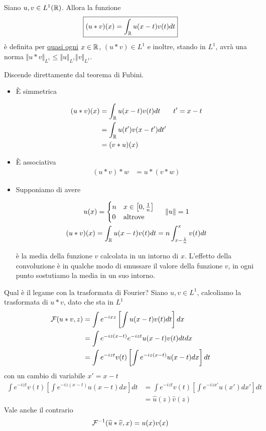 \begin{thm}
Siano $u, v\in L^{1}(\mathbb{R})$. Allora la funzione
\begin{equation*}
\boxed{(u*v)(x) = \int_{\mathbb{R}} u(x - t) v(t) dt}
\end{equation*}
è definita per \underline{quasi ogni} $x\in \mathbb{R}$, $(u*v) \in L^{1}$ e inoltre, stando in $L^{1}$, avrà una norma $ \Vert u*v \Vert_{L^{1}} \leq \Vert u \Vert_{L^{1}} \Vert v \Vert_{L^{1}}$.
\end{thm}
Discende direttamente dal teorema di Fubini.
\begin{itemize}
\item È simmetrica

\begin{align*}
(u*v)(x) & = \int_{\mathbb{R}} u(x - t) v(t) dt & t' = x - t\\
 & = \int_{\mathbb{R}} u(t') v(x - t') dt' & \\
 & = (v*u)(x) &
\end{align*}
\item È associativa
\begin{align*}
(u*v) *w & = u*(v*w)
\end{align*}
\item Supponiamo di avere

\begin{gather*}
u(x) =
\begin{cases}
n & x\in \left[0, \frac{1}{n}\right]\\
0 & \text{altrove}
\end{cases} \ \ \ \ \Vert u \Vert = 1\\
(u*v)(x) = \int_{\mathbb{R}} u(x - t) v(t) dt = n\int^{x}_{x - \frac{1}{n}} v(t) dt
\end{gather*}

è la media della funzione $v$ calcolata in un intorno di $x$. L'effetto della convoluzione è in qualche modo di smussare il valore della funzione $v$, in ogni punto sostutiamo la media in un suo intorno.
\end{itemize}

Qual è il legame con la trasformata di Fourier? Siano $u, v\in L^{1}$, calcoliamo la trasformata di $u*v$, dato che sta in $L^{1}$
\begin{align*}
\mathcal{F}(u*v, z) & = \int e^{- ixz}\left[\int u(x - t) v(t) dt\right] dx\\
 & = \int e^{- iz(x - t)} e^{- izt} u(x - t) v(t) dtdx\\
 & = \int e^{- izt} v(t)\left[\int e^{- iz(x - t)} u(x - t) dx\right] dt
\end{align*}
con un cambio di variabile $x' = x - t$
\begin{align*}
\int e^{- izt} v(t)\left[\int e^{- iz(x - t)} u(x - t) dx\right] dt & = \int e^{- izt} v(t)\left[\int e^{- izx'} u(x') dx'\right] dt\\
 & = \hat{u}(z)\hat{v}(z)
\end{align*}
Vale anche il contrario
\begin{equation*}
\mathcal{F}^{- 1}(\widehat{u} *\widehat{v}, x) = u(x) v(x)
\end{equation*}

